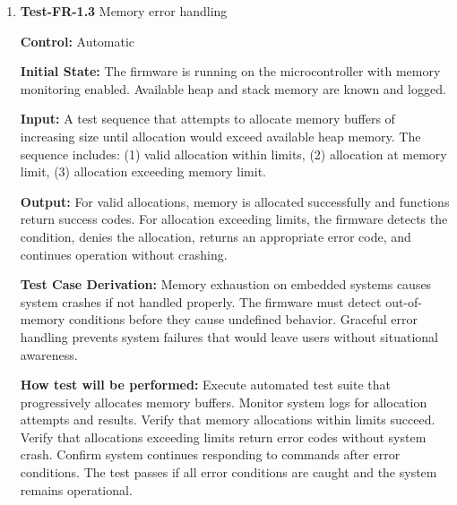 \documentclass[12pt, titlepage]{article}
\begin{document}
\begin{enumerate}
\textbf{Output:}
Four synchronized audio buffers, each containing the impulse signal, and a time 
alignment value for each pair of channels. 

\textbf{Test Case Derivation:} 
Accurate direction of arrival estimation requires precise temporal alignment
across microphone channels. Misalignment exceeding 10 microseconds will degrade
localization accuracy per the system's spatial resolution requirements.
					
\textbf{How test will be performed:}
Generate acoustic impulse at known location. Capture audio on all four channels
for 1 second. Export captured buffers to analysis software. Compute
cross-correlation between all channel pairs. Calculate maximum time delay
between channels. The test passes if all channel pairs show time alignment
within 10 microseconds after compensating for physical propagation delays.

\item{\textbf{Test-FR-1.3} Memory error handling\\}

\textbf{Control:} Automatic
					
\textbf{Initial State:} 
The firmware is running on the microcontroller with memory monitoring enabled.
Available heap and stack memory are known and logged.
					
\textbf{Input:}
A test sequence that attempts to allocate memory buffers of increasing size
until allocation would exceed available heap memory. The sequence includes: (1)
valid allocation within limits, (2) allocation at memory limit, (3) allocation
exceeding memory limit.
					
\textbf{Output:}
For valid allocations, memory is allocated successfully and functions return
success codes. For allocation exceeding limits, the firmware detects the
condition, denies the allocation, returns an appropriate error code, and
continues operation without crashing. 

\textbf{Test Case Derivation:} 
Memory exhaustion on embedded systems causes system crashes if not handled
properly. The firmware must detect out-of-memory conditions before they cause
undefined behavior. Graceful error handling prevents system failures that would
leave users without situational awareness.
					
\textbf{How test will be performed:}
Execute automated test suite that progressively allocates memory buffers.
Monitor system logs for allocation attempts and results. Verify that memory
allocations within limits succeed. Verify that allocations exceeding limits
return error codes without system crash. Confirm system continues responding to
commands after error conditions. The test passes if all error conditions are
caught and the system remains operational.


\end{enumerate}
\end{document}
